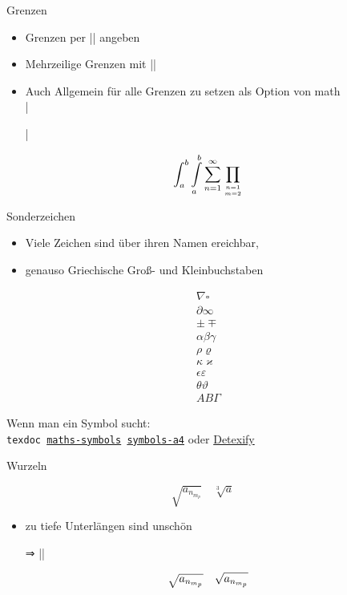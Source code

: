 \documentclass[
	vorläufig=false,
	datum=2022-11-09,
	titel={Mathematiksatz},
	web=false,
	max,
	aspectratio=1610,
]{../tex/latexkurs-slides}
\begin{document}
\begin{frame}[fragile]{Grenzen}
\begin{itemize}
\item Grenzen per |\limits| angeben
\item Mehrzeilige Grenzen mit |\atop|
\item Auch Allgemein für alle Grenzen zu setzen als Option von \AmS math\\
        |\usepackage[intlimits,sumlimits]{amsmath}|
\end{itemize}
\vspace{1em}
\begin{LTXexample}
\[
  \int_a^b
  \int\limits_a^b
  \sum_{n=1}^\infty
  \prod_{n = 1 \atop m = 2}
\]
\end{LTXexample}
\end{frame}

\begin{frame}[fragile]{Sonderzeichen}
\begin{itemize}
\item Viele Zeichen sind über ihren Namen ereichbar,
\item genauso Griechische Groß- und Kleinbuchstaben
\end{itemize}
\begin{LTXexample}[preset=\vspace{-1em}]
\begin{align*}
  \nabla \square \\ 
  \partial \infty \\
  \pm \mp \\
  \alpha \beta \gamma \\
  \rho \varrho \\
  \kappa \varkappa \\
  \epsilon \varepsilon \\
  \theta \vartheta \\
   A B \Gamma 
\end{align*}
\end{LTXexample}
\pause
Wenn man ein Symbol sucht:\\
\texttt{texdoc \href{http://mirrors.ctan.org/info/symbols/math/maths-symbols.pdf}{maths-symbols} \href{http://mirrors.ctan.org/info/symbols/comprehensive/symbols-a4.pdf}{symbols-a4}}
oder \alert{\href{http://detexify.kirelabs.org/classify.html}{Detexify}}
\end{frame}

\begin{frame}[fragile]{Wurzeln}
\begin{LTXexample}[preset=\Large]
\[
  \sqrt{a_{n_{m_p}}}
  \quad
  \sqrt[3]{a}\quad
\]
\end{LTXexample}
\pause
\begin{itemize}
\item zu tiefe Unterlängen sind unschön \item[⇒] ||
\end{itemize}
\begin{LTXexample}[preset=\Large]
\[
  \sqrt{a_{n_{m_p}}}
  \quad
  \sqrt{
    \smash[b]{
      a_{n_{m_p}}
    }
  }
\]
\end{LTXexample}
\end{frame}
\end{document}
